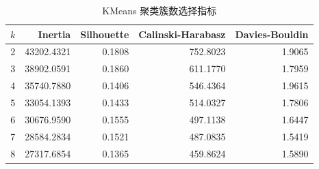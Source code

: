 \begin{table}[H]
\centering
\caption{KMeans 聚类簇数选择指标}
\label{tab:clustering-kmeans-scores}
\begin{tabular}{rrrrr}
\toprule
$k$ & Inertia & Silhouette & Calinski-Harabasz & Davies-Bouldin \\
\midrule
2 & 43202.4321 & 0.1808 & 752.8023 & 1.9065 \\
3 & 38902.0591 & 0.1860 & 611.1770 & 1.7959 \\
4 & 35740.7880 & 0.1406 & 546.4364 & 1.9615 \\
5 & 33054.1393 & 0.1433 & 514.0327 & 1.7806 \\
6 & 30676.9590 & 0.1555 & 497.1138 & 1.6447 \\
7 & 28584.2834 & 0.1521 & 487.0835 & 1.5419 \\
8 & 27317.6854 & 0.1365 & 459.8624 & 1.5890 \\
\bottomrule
\end{tabular}
\end{table}
